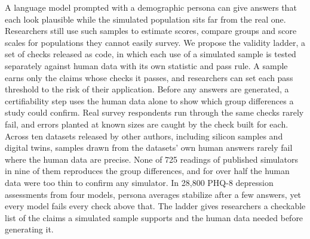 A language model prompted with a demographic persona can give answers that each look plausible while the simulated population sits far from the real one.
Researchers still use such samples to estimate scores, compare groups and score scales for populations they cannot easily survey.
We propose the validity ladder, a set of checks released as code, in which each use of a simulated sample is tested separately against human data with its own statistic and pass rule.
A sample earns only the claims whose checks it passes, and researchers can set each pass threshold to the risk of their application.
Before any answers are generated, a certifiability step uses the human data alone to show which group differences a study could confirm.
Real survey respondents run through the same checks rarely fail, and errors planted at known sizes are caught by the check built for each.
Across ten datasets released by other authors, including silicon samples and digital twins, samples drawn from the datasets' own human answers rarely fail where the human data are precise.
None of 725 readings of published simulators in nine of them reproduces the group differences, and for over half the human data were too thin to confirm any simulator.
In 28,800 PHQ-8 depression assessments from four models, persona averages stabilize after a few answers, yet every model fails every check above that.
The ladder gives researchers a checkable list of the claims a simulated sample supports and the human data needed before generating it.

